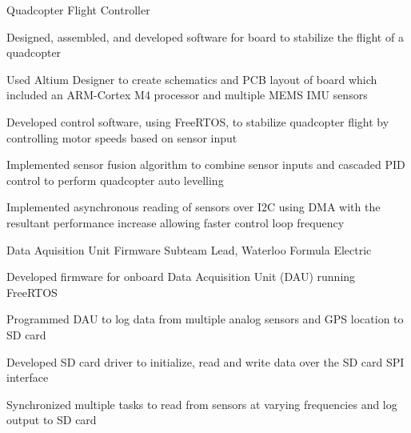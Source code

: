 

\begin{cventries}

  \cventry
    {Quadcopter Flight Controller} %
    {} %
    {} %
    {} %
    {
      \begin{cvitems} %
        \item {Designed, assembled, and developed software for board to stabilize the flight of a quadcopter}
        \item {Used Altium Designer to create schematics and PCB layout of board which included an ARM-Cortex M4 processor and multiple MEMS IMU sensors}
        \item {Developed control software, using FreeRTOS, to stabilize quadcopter flight by controlling motor speeds based on sensor input}
        \item {Implemented sensor fusion algorithm to combine sensor inputs and cascaded PID control to perform quadcopter auto levelling}
        \item {Implemented asynchronous reading of sensors over I2C using DMA with the resultant performance increase allowing faster control loop frequency}
      \end{cvitems}
    }

  \cventry
    {Data Aquisition Unit} %
    {Firmware Subteam Lead, Waterloo Formula Electric} %
    {} %
    {} %
    {
      \begin{cvitems} %
        \item {Developed firmware for onboard Data Acquisition Unit (DAU) running FreeRTOS}
        \item {Programmed DAU to log data from multiple analog sensors and GPS location to SD card}
        \item {Developed SD card driver to initialize, read and write data over the SD card SPI interface}
        \item {Synchronized multiple tasks to read from sensors at varying frequencies and log output to SD card}
      \end{cvitems}
    }


\end{cventries}
